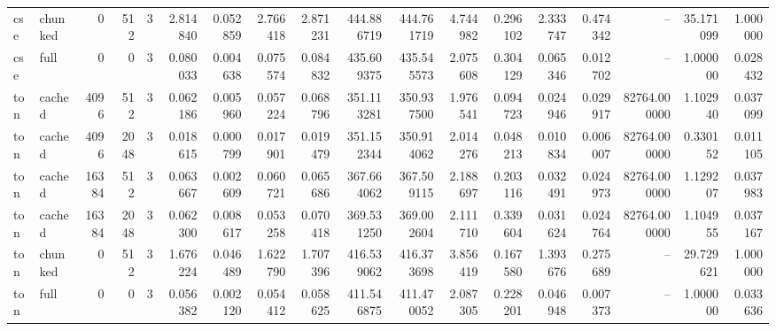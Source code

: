 \begin{tabular}{llrrrrrrrrrrrrrrrr}
cse & chunked & 0 & 512 & 3 & 2.814840 & 0.052859 & 2.766418 & 2.871231 & 444.886719 & 444.761719 & 4.744982 & 0.296102 & 2.333747 & 0.474342 & -- & 35.171099 & 1.000000 \\
cse & full & 0 & 0 & 3 & 0.080033 & 0.004638 & 0.075574 & 0.084832 & 435.609375 & 435.545573 & 2.075608 & 0.304129 & 0.065346 & 0.012702 & -- & 1.000000 & 0.028432 \\
ton & cached & 4096 & 512 & 3 & 0.062186 & 0.005960 & 0.057224 & 0.068796 & 351.113281 & 350.937500 & 1.976541 & 0.094723 & 0.024946 & 0.029917 & 82764.000000 & 1.102940 & 0.037099 \\
ton & cached & 4096 & 2048 & 3 & 0.018615 & 0.000799 & 0.017901 & 0.019479 & 351.152344 & 350.914062 & 2.014276 & 0.048213 & 0.010834 & 0.006007 & 82764.000000 & 0.330152 & 0.011105 \\
ton & cached & 16384 & 512 & 3 & 0.063667 & 0.002609 & 0.060721 & 0.065686 & 367.664062 & 367.509115 & 2.188697 & 0.203116 & 0.032491 & 0.024973 & 82764.000000 & 1.129207 & 0.037983 \\
ton & cached & 16384 & 2048 & 3 & 0.062300 & 0.008617 & 0.053258 & 0.070418 & 369.531250 & 369.002604 & 2.111710 & 0.339604 & 0.031624 & 0.024764 & 82764.000000 & 1.104955 & 0.037167 \\
ton & chunked & 0 & 512 & 3 & 1.676224 & 0.046489 & 1.622790 & 1.707396 & 416.539062 & 416.373698 & 3.856419 & 0.167580 & 1.393676 & 0.275689 & -- & 29.729621 & 1.000000 \\
ton & full & 0 & 0 & 3 & 0.056382 & 0.002120 & 0.054412 & 0.058625 & 411.546875 & 411.470052 & 2.087305 & 0.228201 & 0.046948 & 0.007373 & -- & 1.000000 & 0.033636 \\
\bottomrule
\end{tabular}
